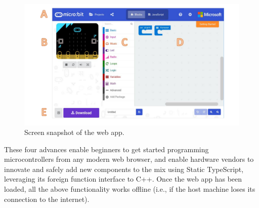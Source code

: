\begin{figure}[t]
      \includegraphics[width=5in]{screenSnapFig.pdf}
  \caption{\label{fig:screenSnap}Screen snapshot of the \MC web app. }
  \end{figure}


These four advances enable beginners to get started programming microcontrollers from any modern web browser, and enable
hardware vendors to innovate and safely add new components to the mix using Static TypeScript, leveraging its
foreign function interface to C++.
Once the web app has been loaded, all the above functionality works offline (i.e., if the host machine loses its connection
to the internet).

